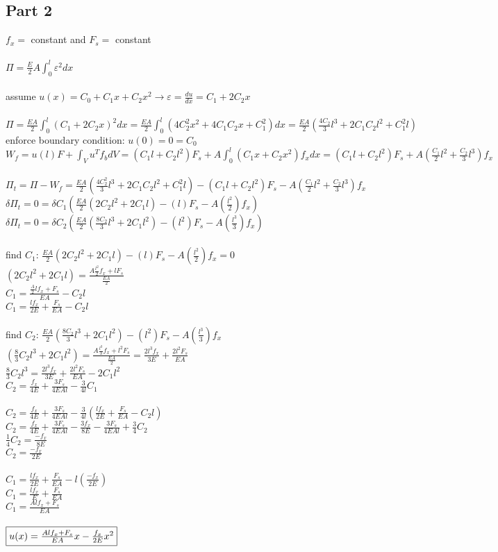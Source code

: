 \documentclass{article}
\begin{document}
\subsection*{Part 2}
$f_x=$ constant and $F_s=$ constant \\\\
$\Pi=\frac{E}{2}A\int_{0}^{l}\varepsilon^2 dx$ \\\\
assume $u(x)=C_0+C_1x+C_2x^2 \rightarrow \varepsilon=\frac{du}{dx}=C_1+2C_2x$ \\\\
$\Pi=\frac{EA}{2}\int_{0}^{l}(C_1+2C_2x)^2 dx=\frac{EA}{2}\int_{0}^{l}(4C_2^2x^2+4C_1C_2x+C_1^2)dx
=\frac{EA}{2}(\frac{4C_2}{3}l^3+2C_1C_2l^2+C_1^2l)$\\
enforce boundary condition: $u(0)=0=C_0$ \\
$W_f=u(l)F+\int_{V}u^Tf_bdV=(C_1l+C_2l^2)F_s+A\int_{0}^{l}(C_1x+C_2x^2)f_xdx=(C_1l+C_2l^2)F_s+
A(\frac{C_1}{2}l^2+\frac{C_2}{3}l^3)f_x$ \\\\
$\Pi_t=\Pi-W_f=\frac{EA}{2}(\frac{4C_2^2}{3}l^3+2C_1C_2l^2+C_1^2l)-(C_1l+C_2l^2)F_s-
A(\frac{C_1}{2}l^2+\frac{C_2}{3}l^3)f_x$ \\
$\delta\Pi_t=0=\delta C_1(\frac{EA}{2}(2C_2l^2+2C_1l)-(l)F_s-A(\frac{l^2}{2})f_x)$ \\
$\delta\Pi_t=0=\delta C_2(\frac{EA}{2}(\frac{8C_2}{3}l^3 + 2C_1l^2)-(l^2)F_s-A(\frac{l^3}{3})f_x)$ \\\\
find $C_1$: $\frac{EA}{2}(2C_2l^2+2C_1l)-(l)F_s-A(\frac{l^2}{2})f_x=0$ \\
$(2C_2l^2+2C_1l)=\frac{A\frac{l^2}{2}f_x+lF_s}{\frac{EA}{2}}$ \\
$C_1=\frac{\frac{A}{2}lf_x+F_s}{EA}-C_2l$ \\
$C_1=\frac{lf_x}{2E}+\frac{F_s}{EA}-C_2l$ \\\\
find $C_2$: $\frac{EA}{2}(\frac{8C_2}{3}l^3 + 2C_1l^2)-(l^2)F_s-A(\frac{l^3}{3})f_x$ \\
$(\frac{8}{3}C_2l^3+2C_1l^2)=\frac{A\frac{l^3}{3}f_x+l^2F_s}{\frac{EA}{2}}=\frac{2l^3f_x}{3E}+
\frac{2l^2F_s}{EA}$ \\
$\frac{8}{3}C_2l^3=\frac{2l^3f_x}{3E}+\frac{2l^2F_s}{EA}-2C_1l^2$ \\
$C_2=\frac{f_x}{4E}+\frac{3F_s}{4EAl}-\frac{3}{4l}C_1$ \\\\
$C_2=\frac{f_x}{4E}+\frac{3F_s}{4EAl}-\frac{3}{4l}(\frac{lf_x}{2E}+\frac{F_s}{EA}-C_2l)$ \\
$C_2=\frac{f_x}{4E}+\frac{3F_s}{4EAl}-\frac{3f_x}{8E}-\frac{3F_s}{4EAl}+\frac{3}{4}C_2$ \\
$\frac{1}{4}C_2=\frac{-f_x}{8E}$ \\
$C_2=\frac{-f_x}{2E}$ \\\\
$C_1=\frac{lf_x}{2E}+\frac{F_s}{EA}-l(\frac{-f_x}{2E})$ \\
$C_1=\frac{lf_x}{E}+\frac{F_s}{EA}$ \\
$C_1=\frac{Alf_x+F_s}{EA}$ \\\\
$\fbox{$u(x)=\frac{Alf_x+F_s}{EA}x-\frac{f_x}{2E}x^2$}$
\end{document}
